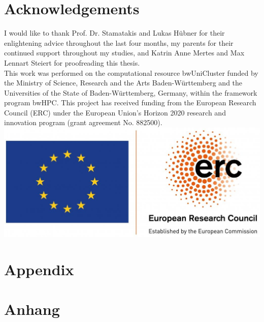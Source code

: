 
\chapter{Acknowledgements}
I would like to thank Prof. Dr. Stamatakis and Lukas Hübner for their enlightening advice throughout the last four months, my parents for their continued support throughout my studies, and Katrin Anne Mertes and Max Lennart Steiert for proofreading this thesis.
\\

This work was performed on the computational resource bwUniCluster funded by the Ministry of Science, Research and the Arts Baden-Württemberg and the Universities of the State of Baden-Württemberg, Germany, within the framework program bwHPC.
This project has received funding from the European Research Council (ERC) under the European Union’s Horizon 2020 research and innovation program (grant agreement No. 882500).
\\
\vspace{4cm}
\includegraphics[scale=0.1]{logos/erc.png}

\printglossary[type=\acronymtype]
\printglossary

{\chapter{Appendix}}    %
{\chapter{Anhang}}      %
\label{chap:appendix}

